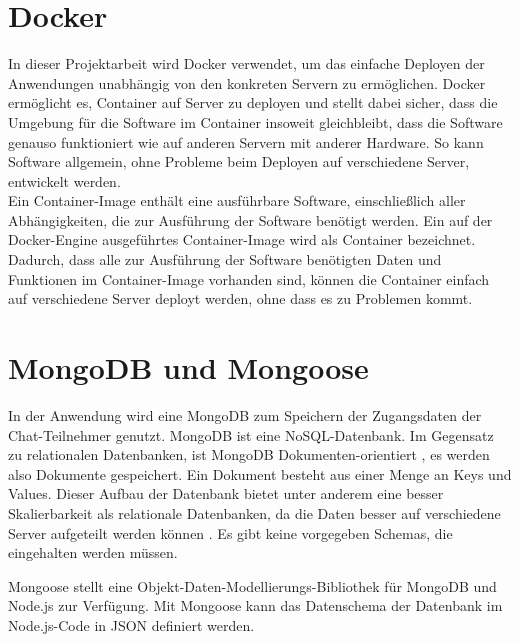 \section{Docker}\label{sec:Docker}
In dieser Projektarbeit wird Docker verwendet, um das einfache Deployen der Anwendungen unabhängig von den konkreten Servern zu ermöglichen. Docker ermöglicht es, Container auf Server zu deployen und stellt dabei sicher, dass die Umgebung für die Software im Container insoweit gleichbleibt, dass die Software genauso funktioniert wie auf anderen Servern mit anderer Hardware. So kann Software allgemein, ohne Probleme beim Deployen auf verschiedene Server, entwickelt werden.\\ Ein Container-Image enthält eine ausführbare Software, einschließlich aller Abhängigkeiten, die zur Ausführung der Software benötigt werden. Ein auf der Docker-Engine ausgeführtes Container-Image wird als Container bezeichnet. Dadurch, dass alle zur Ausführung der Software benötigten Daten und Funktionen im Container-Image vorhanden sind, können die Container einfach auf verschiedene Server deployt werden, ohne dass es zu Problemen kommt. \cite[vgl.][]{Docker.2019}
\section{MongoDB und Mongoose}\label{sec:MongoDB}
In der Anwendung wird eine MongoDB zum Speichern der Zugangsdaten der Chat-Teilnehmer genutzt. MongoDB ist eine NoSQL-Datenbank. Im Gegensatz zu relationalen Datenbanken, ist MongoDB Dokumenten-orientiert \cite[vgl.][3]{Chadorow.2013}, es werden also Dokumente gespeichert. 
Ein Dokument besteht aus einer Menge an Keys und Values. Dieser Aufbau der Datenbank bietet unter anderem eine
besser Skalierbarkeit als relationale Datenbanken, da die Daten besser auf verschiedene Server aufgeteilt werden
können \cite[vgl.][4]{Chadorow.2013}. Es gibt keine vorgegeben Schemas, die eingehalten werden müssen.

Mongoose stellt eine Objekt-Daten-Modellierungs-Bibliothek für MongoDB und Node.js zur Verfügung. Mit Mongoose kann das Datenschema der Datenbank im Node.js-Code in JSON definiert werden. \cite[vgl.][10]{Holmes.2013}


